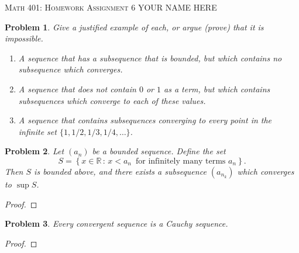 \documentclass[12pt]{article}
\newtheorem{problem}{Problem}
\newcommand{\RR}{\ensuremath{\mathbb R}}
\begin{document}
\small
\noindent \textsc{Math 401: Homework Assignment 6} \hfill YOUR NAME HERE

\normalsize
\bigskip

\setcounter{problem}{35}

\begin{problem} %
Give a justified example of each, or argue (prove) that it is impossible.

\renewcommand{\labelenumi}{(\alph{enumi})}
\begin{enumerate}
\item A sequence that has a subsequence that is bounded, but which contains no subsequence which converges.


\item A sequence that does not contain $0$ or $1$ as a term, but which contains subsequences which converge to each of these values.


\item A sequence that contains subsequences converging to every point in the infinite set $\{1,1/2,1/3,1/4,\dots\}$.


\end{enumerate}
\end{problem}


\begin{problem} %
Let $(a_n)$ be a bounded sequence.  Define the set
	$$S = \left\{x\in\RR\,:\, x < a_n \,\text{ for infinitely many terms } a_n\right\}.$$
Then $S$ is bounded above, and there exists a subsequence $(a_{n_k})$ which converges to $\sup S$.
\end{problem}

\begin{proof}
\end{proof}


\begin{problem} %
Every convergent sequence is a Cauchy sequence.
\end{problem}


\begin{proof}
\end{proof}
\end{document}

